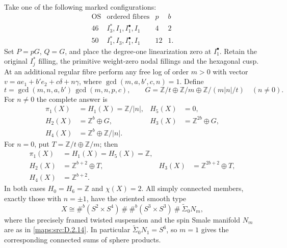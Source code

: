 \begin{theorem}
Take one of the following marked configurations:
\[
\begin{array}{c|l|r|r}
 \mathrm{OS}&\text{ordered fibres}&p&b\\\hline
 46&I_3^*,I_1,I_1^\bullet,I_1&4&2\\
 50&I_1^*,I_3,I_1^\bullet,I_1&12&1.
\end{array}
\]
Set $P=pG$, $Q=G$, and place the degree-one linearization
zero at $I_1^\bullet$. Retain the original $I_j^*$ filling,
the primitive weight-zero nodal fillings and the hexagonal cusp.
At an additional regular fibre perform any free log of order
$m>0$ with vector $v=a e_1+b' e_2+c\delta+n\gamma$,
where $\gcd(m,a,b',c,n)=1$. Define
\[
 t=\gcd(m,n,a,b')\,\gcd(m,n,p,c),\qquad
 G=\mathbb Z/t\oplus\mathbb Z/m\oplus\mathbb Z/(m|n|/t)
 \quad(n\ne0).
\]
For $n\ne0$ the complete answer is
\[
\begin{aligned}
 \pi_1(X)&=H_1(X)=\mathbb Z/|n|, &H_5(X)&=0,\\
 H_2(X)&=\mathbb Z^b\oplus G,
 &H_3(X)&=\mathbb Z^{2b}\oplus G,\\
 H_4(X)&=\mathbb Z^b\oplus\mathbb Z/|n|.
\end{aligned}
\tag{D.T1}\label{maps:eq:D.T1}
\]
For $n=0$, put $T=\mathbb Z/t\oplus\mathbb Z/m$; then
\[
\begin{aligned}
 \pi_1(X)&=H_1(X)=H_5(X)=\mathbb Z,\\
 H_2(X)&=\mathbb Z^{b+2}\oplus T,
 &H_3(X)&=\mathbb Z^{2b+2}\oplus T,\\
 H_4(X)&=\mathbb Z^{b+2}.
\end{aligned}
\tag{D.T2}\label{maps:eq:D.T2}
\]
In both cases $H_0=H_6=\mathbb Z$ and $\chi(X)=2$.
All simply connected members, exactly those with $n=\pm1$,
have the oriented smooth type
\[
 X\cong \#^b(S^2\times S^4)\ \#\ \#^b(S^3\times S^3)
                   \ \#\ \widetilde\Sigma_0 N_m,
 \tag{D.T3}\label{maps:eq:D.T3}
\]
where the precisely framed twisted suspension and the spin
Smale manifold $N_m$ are as in \ref{maps:src:D.2.14}. In particular
$\widetilde\Sigma_0N_1=S^6$, so $m=1$ gives the corresponding
connected sums of sphere products.
\end{theorem}


